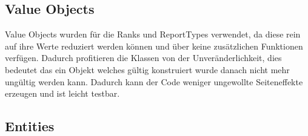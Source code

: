 
\subsection{Value Objects} %





Value Objects wurden für die Ranks und ReportTypes verwendet, da diese rein auf ihre Werte reduziert werden können und über keine zusätzlichen Funktionen verfügen.
Dadurch profitieren die Klassen von der Unveränderlichkeit, dies bedeutet das ein Objekt welches gültig konstruiert wurde danach nicht mehr ungültig werden kann.
Dadurch kann der Code weniger ungewollte Seiteneffekte erzeugen und ist leicht testbar.


\subsection{Entities}

